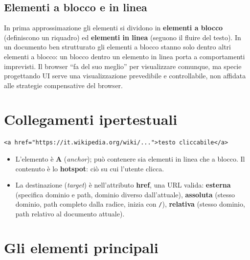 \subsection{Elementi a blocco e in linea}
In prima approssimazione gli elementi si dividono in \textbf{elementi a blocco} (definiscono
un riquadro) ed \textbf{elementi in linea} (seguono il fluire del testo). In un documento ben
strutturato gli elementi a blocco stanno solo dentro altri elementi a blocco: un blocco dentro
un elemento in linea porta a comportamenti imprevisti. Il browser ``fa del suo meglio'' per
visualizzare comunque, ma specie progettando UI serve una visualizzazione prevedibile e
controllabile, non affidata alle strategie compensative del browser.

\section{Collegamenti ipertestuali}
\begin{lstlisting}[language=HTMLCSS]
<a href="https://it.wikipedia.org/wiki/...">testo cliccabile</a>
\end{lstlisting}
\begin{itemize}
  \item L'elemento \`e \textbf{A} (\emph{anchor}); pu\`o contenere sia elementi in linea che
        a blocco. Il contenuto \`e lo \textbf{hotspot}: ci\`o su cui l'utente clicca.
  \item La destinazione (\emph{target}) \`e nell'attributo \textbf{href}, una URL valida:
        \textbf{esterna} (specifica dominio e path, dominio diverso dall'attuale),
        \textbf{assoluta} (stesso dominio, path completo dalla radice, inizia con \texttt{/}),
        \textbf{relativa} (stesso dominio, path relativo al documento attuale).
\end{itemize}

\section{Gli elementi principali}

